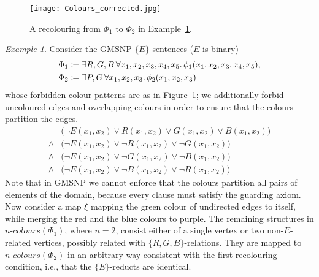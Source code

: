 \documentclass[oneside,reqno,12pt]{amsart}
\theoremstyle{plain}
\theoremstyle{remark}
\newtheorem{example}[thm]{Example}
\renewcommand{\coloneqq}{\mathrel{\mathop:}\mathrel{\mkern-1.2mu}=}
\newcommand{\colours}{\ensuremath{n\text{-}\mathit{colours}}}
\begin{document}
{\begin{figure}[ht]
     \centering
      \texttt{[image: Colours\_corrected.jpg]}
     \caption{A recolouring from $\Phi_1$ to $\Phi_2$ in Example~\ref{ex:recolouring}.}
     \label{fig:colour_patterns}
 \end{figure} 


\begin{example} \label{ex:recolouring}
Consider the GMSNP $\{E\}$-sentences ($E$ is binary) 
\begin{align*} 
\Phi_1\coloneqq \exists & R,G,B\,  \forall x_1,x_2,x_3,x_4,x_5\ldotp \phi_1(x_1,x_2,x_3,x_4,x_5), \\
\Phi_2\coloneqq \exists & P,G\, \forall x_1,x_2,x_3\ldotp \phi_2(x_1,x_2,x_3)     
\end{align*}
whose forbidden colour patterns are as in Figure~\ref{fig:colour_patterns}; we additionally forbid uncoloured edges and overlapping colours in order to ensure that the colours partition the edges.
\begin{align*}
 & \big(\neg E(x_1,x_2) \vee R(x_1,x_2) \vee G(x_1,x_2) \vee B(x_1,x_2) \big)\\  {} \wedge {} &  \big(\neg E(x_1,x_2) \vee \neg R(x_1,x_2) \vee \neg G(x_1,x_2)  \big)  \\
 {}    \wedge {} & \big(\neg E(x_1,x_2) \vee \neg G(x_1,x_2) \vee \neg B(x_1,x_2)  \big)\\
 {} \wedge {} &\big(\neg E(x_1,x_2) \vee \neg B(x_1,x_2) \vee \neg R(x_1,x_2)  \big)   
\end{align*}
Note that in GMSNP we cannot enforce that the colours partition all pairs of elements of the domain, because every clause must satisfy the guarding axiom. 
Now consider a map $\xi$ mapping the green colour of undirected edges to itself, while merging the red and the blue colours to purple.
The remaining structures in $\colours(\Phi_1)$, where $n=2$, consist either of a single vertex or two non-$E$-related vertices, possibly related with $\{R,G,B\}$-relations. 
They are mapped to $\colours(\Phi_2)$ in an arbitrary way consistent with the first recolouring condition, i.e., that the $\{E\}$-reducts are identical.





\end{example}}
\end{document}

